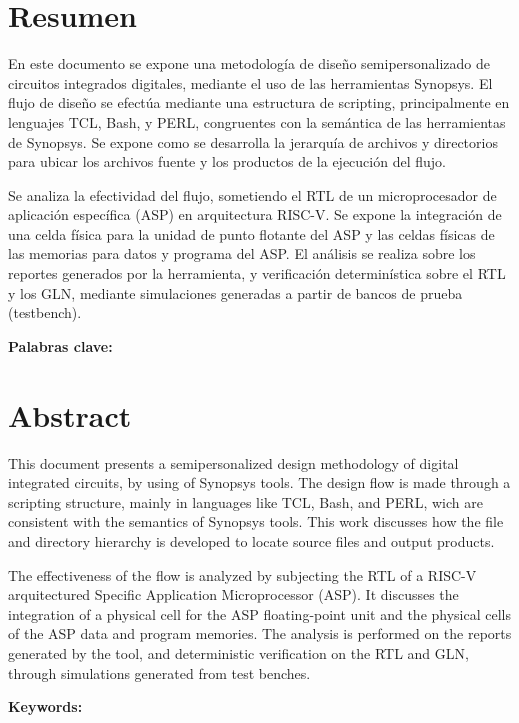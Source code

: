 \chapter*{Resumen}
En este documento se expone una metodología de diseño semipersonalizado de circuitos integrados digitales, mediante el uso de las herramientas Synopsys. El flujo de diseño se efectúa mediante una estructura de scripting, principalmente en lenguajes TCL, Bash, y PERL, congruentes con la semántica de las herramientas de Synopsys. Se expone como se desarrolla la jerarquía de archivos y directorios para ubicar los archivos fuente y los productos de la ejecución del flujo.

Se analiza la efectividad del flujo, sometiendo el RTL de un microprocesador de aplicación específica (ASP) en arquitectura RISC-V. Se expone la integración de una celda física para la unidad de punto flotante del ASP y las celdas físicas de las memorias para datos y programa del ASP. El análisis se realiza sobre los reportes generados por la herramienta, y verificación determinística sobre el RTL y los GLN, mediante simulaciones generadas a partir de bancos de prueba (testbench).


\bigskip

\textbf{Palabras clave:} \scriptKeywords

\clearpage
\chapter*{Abstract}
\thispagestyle{empty}

This document presents a semipersonalized design methodology of digital integrated circuits, by using of Synopsys tools. The design flow is made through a scripting structure, mainly in languages like TCL, Bash, and PERL, wich are consistent with the semantics of Synopsys tools. This work discusses how the file and directory hierarchy is developed to locate source files and output products.

The effectiveness of the flow is analyzed by subjecting the RTL of a RISC-V arquitectured Specific Application Microprocessor (ASP). It discusses the integration of a physical cell for the ASP floating-point unit and the physical cells of the ASP data and program memories. The analysis is performed on the reports generated by the tool, and deterministic verification on the RTL and GLN, through simulations generated from test benches.

\bigskip

\textbf{Keywords:} \scriptKeywords 

\cleardoublepage

